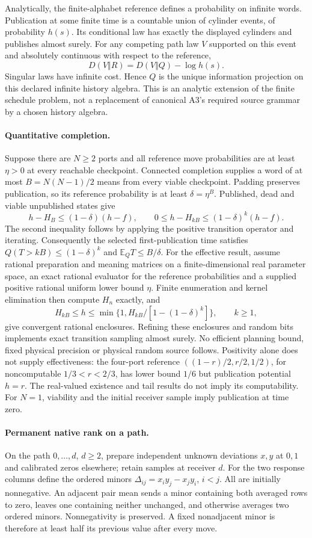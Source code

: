 Analytically, the finite-alphabet reference defines a probability on
infinite words. Publication at some finite time is a countable union of
cylinder events, of probability $h(s)$. Its conditional law has exactly
the displayed cylinders and publishes almost surely. For any competing
path law $V$ supported on this event and absolutely continuous with respect
to the reference,
\[
 D(V\Vert R)=D(V\Vert Q)-\log h(s).
\]
Singular laws have infinite cost. Hence $Q$ is the unique information
projection on this declared infinite history algebra. This is an analytic
extension of the finite schedule problem, not a replacement of canonical
A3's required source grammar by a chosen history algebra.

\paragraph{Quantitative completion.}
Suppose there are $N\geq2$ ports and all reference move probabilities are
at least $\eta>0$ at every reachable checkpoint. Connected completion
supplies a word of at most $B=N(N-1)/2$ means from every viable checkpoint.
Padding preserves publication, so its reference probability is at least
$\delta=\eta^B$. Published, dead and viable unpublished states give
\[
 h-H_B\leq(1-\delta)(h-f),\qquad
 0\leq h-H_{kB}\leq(1-\delta)^k(h-f).
\]
The second inequality follows by applying the positive transition operator
and iterating. Consequently the selected first-publication time satisfies
$Q(T>kB)\leq(1-\delta)^k$ and $\mathbb E_QT\leq B/\delta$.
For the effective result, assume rational preparation and meaning matrices
on a finite-dimensional real parameter space, an exact rational evaluator
for the reference probabilities and a supplied positive rational uniform
lower bound $\eta$. Finite enumeration and kernel elimination then compute
$H_n$ exactly, and
\[
 H_{kB}\leq h\leq
 \min\{1,H_{kB}/[1-(1-\delta)^k]\},\qquad k\geq1,
\]
give convergent rational enclosures. Refining these enclosures and random
bits implements exact transition sampling almost surely. No efficient
planning bound, fixed physical precision or physical random source follows.
Positivity alone does not supply effectiveness: the four-port reference
$((1-r)/2,r/2,1/2)$, for noncomputable $1/3<r<2/3$, has lower bound $1/6$
but publication potential $h=r$. The real-valued existence and tail results
do not imply its computability.
For $N=1$, viability and the initial receiver sample imply publication at
time zero.

\paragraph{Permanent native rank on a path.}
On the path $0,\ldots,d$, $d\geq2$, prepare independent unknown deviations
$x,y$ at $0,1$ and calibrated zeros elsewhere; retain samples at receiver
$d$. For the two response columns define the ordered minors
$\Delta_{ij}=x_i y_j-x_j y_i$, $i<j$. All are initially nonnegative.
An adjacent pair mean sends a minor containing both averaged rows to zero,
leaves one containing neither unchanged, and otherwise averages two ordered
minors. Nonnegativity is preserved. A fixed nonadjacent minor is therefore
at least half its previous value after every move.

